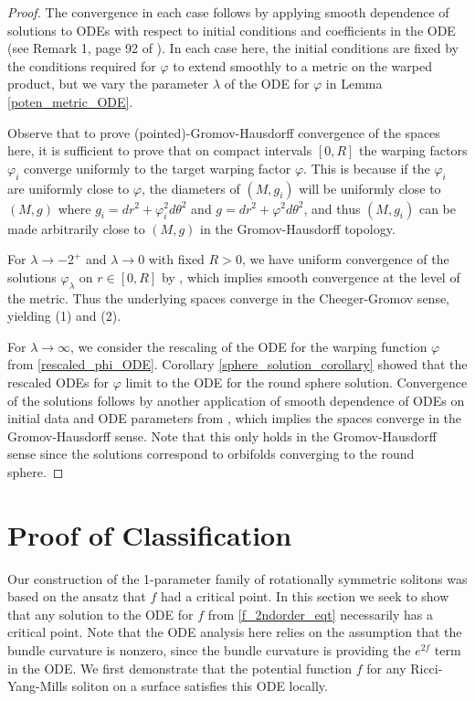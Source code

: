 \documentclass[12pt, a4paper, reqno, oneside]{amsart}
\renewcommand{\phi}{\varphi}
\numberwithin{equation}{section}
\theoremstyle{plain}
\theoremstyle{definition}
\theoremstyle{plain}
\begin{document}
\begin{proof}
  The convergence in each case follows by applying smooth dependence of solutions to ODEs with respect to initial conditions and coefficients in the ODE (see Remark 1, page 92 of \cite{perkoDiffEqtsDynamSys2001}). In each case here, the initial conditions are fixed by the conditions required for $\phi$ to extend smoothly to a metric on the warped product, but we vary the parameter $\lambda$ of the ODE for $\phi$ in Lemma \ref{poten_metric_ODE}.

  Observe that to prove (pointed)-Gromov-Hausdorff convergence of the spaces here, it is sufficient to prove that on compact intervals $[0,R]$ the warping factors $\phi_i$ converge uniformly to the target warping factor $\phi$. This is because if the $\phi_i$ are uniformly close to $\phi$, the diameters of $(M,g_i)$ will be uniformly close to $(M,g)$ where $g_i=dr^2+\phi_i^{2}d\theta^2$ and $g=dr^2+\phi^2d\theta^2$, and thus $(M,g_i)$ can be made arbitrarily close to $(M,g)$ in the Gromov-Hausdorff topology.

  For $\lambda\to -2^{+}$ and $\lambda\to 0$ with fixed $R>0$, we have uniform convergence of the solutions $\phi_{\lambda}$ on $r\in[0,R]$ by \cite{perkoDiffEqtsDynamSys2001}, which implies smooth convergence at the level of the metric. Thus the underlying spaces converge in the Cheeger-Gromov sense, yielding (1) and (2).

  For $\lambda\to\infty$, we consider the rescaling of the ODE for the warping function $\varphi$ from \eqref{rescaled_phi_ODE}. Corollary \ref{sphere_solution_corollary} showed that the rescaled ODEs for $\varphi$ limit to the ODE for the round sphere solution. Convergence of the solutions follows by another application of smooth dependence of ODEs on initial data and ODE parameters from \cite{perkoDiffEqtsDynamSys2001}, which implies the spaces converge in the Gromov-Hausdorff sense. Note that this only holds in the Gromov-Hausdorff sense since the solutions correspond to orbifolds converging to the round sphere.
\end{proof}

\section{Proof of Classification}
Our construction of the 1-parameter family of rotationally symmetric solitons was based on the ansatz that $f$ had a critical point. In this section we seek to show that any solution to the ODE for $f$ from \ref{f_2ndorder_eqt} necessarily has a critical point. Note that the ODE analysis here relies on the assumption that the bundle curvature is nonzero, since the bundle curvature is providing the $e^{2f}$ term in the ODE. We first demonstrate that the potential function $f$ for any Ricci-Yang-Mills soliton on a surface satisfies this ODE locally.
\end{document}
